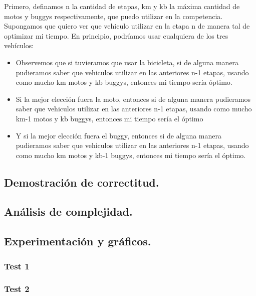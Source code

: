 \vspace*{0.3cm}
Primero, definamos n la cantidad de etapas, km y kb la máxima cantidad de motos y buggys respectivamente, que puedo utilizar en la competencia. Supongamos que quiero ver que vehiculo utilizar en la etapa n de manera tal de optimizar mi tiempo. En principio, podríamos usar cualquiera de los tres vehículos: 
\begin{itemize}
	\item Observemos que si tuvieramos que usar la bicicleta, si de alguna manera pudieramos saber que vehiculos utilizar en las anteriores n-1 etapas, usando como mucho km motos y kb buggys, entonces mi tiempo sería óptimo.
	\item Si la mejor elección fuera la moto, entonces si de alguna manera pudieramos saber que vehiculos utilizar en las anteriores n-1 etapas, usando como mucho km-1 motos y kb buggys, entonces mi tiempo sería el óptimo
	\item Y si la mejor elección fuera el buggy, entonces si de alguna manera pudieramos saber que vehiculos utilizar en las anteriores n-1 etapas, usando como mucho km motos y kb-1 buggys, entonces mi tiempo sería el óptimo.
	
	 
\end{itemize}

\vspace*{0.6cm}

\subsection{Demostración de correctitud.}

\vspace*{0.3cm}



\vspace*{0.6cm}

\subsection{Análisis de complejidad.}

\vspace*{0.3cm}


\vspace*{0.6cm}
\subsection{Experimentación y gráficos.}

\vspace*{0.3cm}

\subsubsection{Test 1}

\vspace*{0.3cm}

\vspace*{0.6cm}
\subsubsection{Test 2}

\vspace*{0.3cm}

